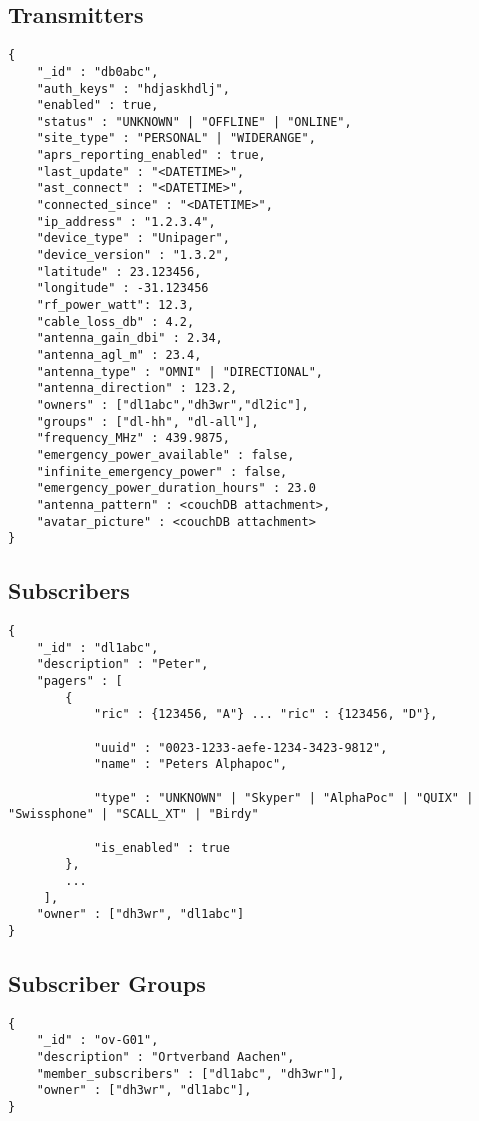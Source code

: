 \subsection{Transmitters}

\begin{lstlisting}
{
	"_id" : "db0abc",
    "auth_keys" : "hdjaskhdlj",
    "enabled" : true,
	"status" : "UNKNOWN" | "OFFLINE" | "ONLINE",
	"site_type" : "PERSONAL" | "WIDERANGE",
	"aprs_reporting_enabled" : true,
    "last_update" : "<DATETIME>",
	"ast_connect" : "<DATETIME>",
	"connected_since" : "<DATETIME>",
    "ip_address" : "1.2.3.4",
    "device_type" : "Unipager",
    "device_version" : "1.3.2",
    "latitude" : 23.123456,
    "longitude" : -31.123456
    "rf_power_watt": 12.3,
    "cable_loss_db" : 4.2,
    "antenna_gain_dbi" : 2.34,
	"antenna_agl_m" : 23.4,
	"antenna_type" : "OMNI" | "DIRECTIONAL",
	"antenna_direction" : 123.2,
    "owners" : ["dl1abc","dh3wr","dl2ic"],
    "groups" : ["dl-hh", "dl-all"],
    "frequency_MHz" : 439.9875,
    "emergency_power_available" : false,
    "infinite_emergency_power" : false,
	"emergency_power_duration_hours" : 23.0        
    "antenna_pattern" : <couchDB attachment>,
    "avatar_picture" : <couchDB attachment>
}
\end{lstlisting}

 
\subsection{Subscribers}
\begin{lstlisting}
{
	"_id" : "dl1abc",
	"description" : "Peter",
	"pagers" : [
		{
    		"ric" : {123456, "A"} ... "ric" : {123456, "D"},

			"uuid" : "0023-1233-aefe-1234-3423-9812",
    		"name" : "Peters Alphapoc",

			"type" : "UNKNOWN" | "Skyper" | "AlphaPoc" | "QUIX" | "Swissphone" | "SCALL_XT" | "Birdy"

			"is_enabled" : true
     	},
     	...
     ],
    "owner" : ["dh3wr", "dl1abc"]
}
\end{lstlisting}

\subsection{Subscriber Groups}

\begin{lstlisting}
{
	"_id" : "ov-G01",
	"description" : "Ortverband Aachen",
	"member_subscribers" : ["dl1abc", "dh3wr"],
    "owner" : ["dh3wr", "dl1abc"],
}
\end{lstlisting}

